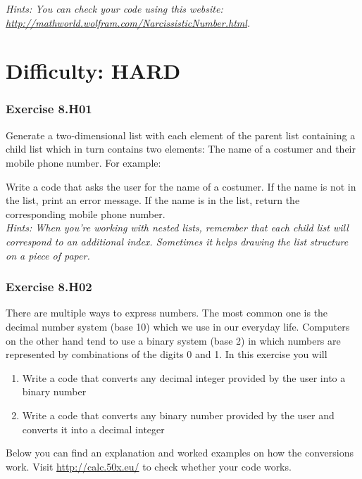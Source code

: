\textit{Hints:
You can check your code using this website: \url{http://mathworld.wolfram.com/NarcissisticNumber.html}.}




\newpage
\section{Difficulty: HARD}

\subsubsection*{Exercise 8.H01}
Generate a two-dimensional list with each element of the parent list containing a child list
which in turn contains two elements: The name of a costumer and their mobile phone
number. For example:\\
\begin{center}
	{}
\end{center}
Write a code that asks the user for the name of a costumer. If the name is not in the list,
print an error message. If the name is in the list, return the corresponding mobile phone
number.\\


\textit{Hints:
When you’re working with nested lists, remember that each child list will correspond to an
additional index. Sometimes it helps drawing the list structure on a piece of paper.}\\[1cm]



\subsubsection*{Exercise 8.H02 \red{[M]}}
There are multiple ways to express numbers. The most common one is the decimal number
system (base 10) which we use in our everyday life. Computers on the other hand tend to
use a binary system (base 2) in which numbers are represented by combinations of the digits
0 and 1. In this exercise you will
\begin{enumerate}[label=(\alph*)]
	\item Write a code that converts any decimal integer provided by the user
into a binary number
	\item Write a code that converts any binary number provided by the user and
converts it into a decimal integer
\end{enumerate}
Below you can find an explanation and worked examples on how the conversions work. Visit
\url{http://calc.50x.eu/} to check whether your code works.\\

